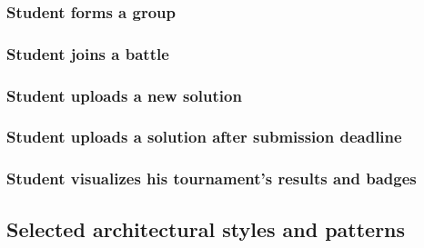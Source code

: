 \documentclass{article}
\begin{document}
{\begin{itemize}
    \subsubsection{Student forms a group}
        \begin{figure}[H]
            \centering
            \caption{}
            \label{fig:}
        \end{figure}
    \subsubsection{Student joins a battle}
        \begin{figure}[H]
            \centering
            \caption{}
            \label{fig:}
        \end{figure}
    \subsubsection{Student uploads a new solution}
        \begin{figure}[H]
            \centering
            \caption{}
            \label{fig:}
        \end{figure}
    \subsubsection{Student uploads a solution after submission deadline}
        \begin{figure}[H]
            \centering
            \caption{}
            \label{fig:}
        \end{figure}
    \subsubsection{Student visualizes his tournament's results and badges}
        \begin{figure}[H]
            \centering
            \caption{}
            \label{fig:}
        \end{figure}
\subsection{Selected architectural styles and patterns}

\end{itemize}}
\end{document}
